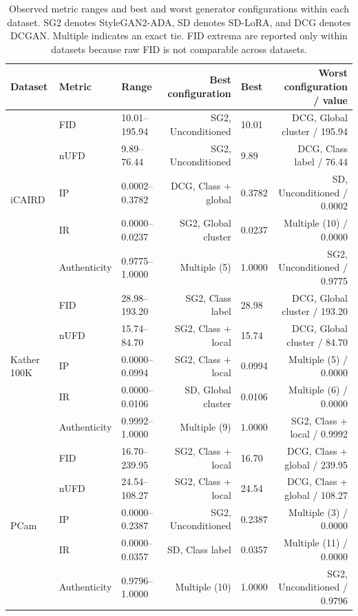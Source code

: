 \begin{table}[htbp]
\centering
\scriptsize
\setlength{\tabcolsep}{3.5pt}
\begin{tabular}{lllrlr}
\toprule
Dataset & Metric & Range & Best configuration & Best & Worst configuration / value \\
\midrule
\multirow{5}{*}{iCAIRD} & FID & 10.01--195.94 & SG2, Unconditioned & 10.01 & DCG, Global cluster / 195.94 \\
 & nUFD & 9.89--76.44 & SG2, Unconditioned & 9.89 & DCG, Class label / 76.44 \\
 & IP & 0.0002--0.3782 & DCG, Class + global & 0.3782 & SD, Unconditioned / 0.0002 \\
 & IR & 0.0000--0.0237 & SG2, Global cluster & 0.0237 & Multiple (10) / 0.0000 \\
 & Authenticity & 0.9775--1.0000 & Multiple (5) & 1.0000 & SG2, Unconditioned / 0.9775 \\
\midrule
\multirow{5}{*}{Kather 100K} & FID & 28.98--193.20 & SG2, Class label & 28.98 & DCG, Global cluster / 193.20 \\
 & nUFD & 15.74--84.70 & SG2, Class + local & 15.74 & DCG, Global cluster / 84.70 \\
 & IP & 0.0000--0.0994 & SG2, Class + local & 0.0994 & Multiple (5) / 0.0000 \\
 & IR & 0.0000--0.0106 & SD, Global cluster & 0.0106 & Multiple (6) / 0.0000 \\
 & Authenticity & 0.9992--1.0000 & Multiple (9) & 1.0000 & SG2, Class + local / 0.9992 \\
\midrule
\multirow{5}{*}{PCam} & FID & 16.70--239.95 & SG2, Class + local & 16.70 & DCG, Class + global / 239.95 \\
 & nUFD & 24.54--108.27 & SG2, Class + local & 24.54 & DCG, Class + global / 108.27 \\
 & IP & 0.0000--0.2387 & SG2, Unconditioned & 0.2387 & Multiple (3) / 0.0000 \\
 & IR & 0.0000--0.0357 & SD, Class label & 0.0357 & Multiple (11) / 0.0000 \\
 & Authenticity & 0.9796--1.0000 & Multiple (10) & 1.0000 & SG2, Unconditioned / 0.9796 \\
\bottomrule
\end{tabular}
\caption{Observed metric ranges and best and worst generator configurations within each dataset. SG2 denotes StyleGAN2-ADA, SD denotes SD-LoRA, and DCG denotes DCGAN. Multiple indicates an exact tie. FID extrema are reported only within datasets because raw FID is not comparable across datasets.}
\label{tab:quality-range-best-worst}
\end{table}
